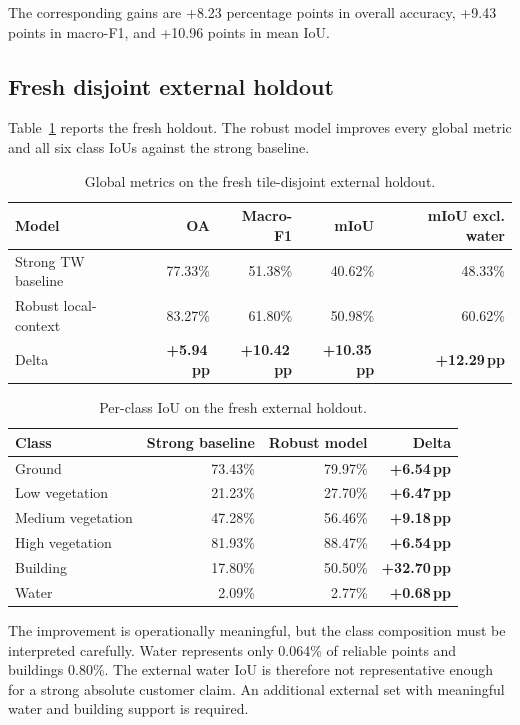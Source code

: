 \documentclass[11pt,a4paper]{article}
\newcommand{\pp}{\,pp}
\newcommand{\good}[1]{\textcolor{evogreen}{\textbf{#1}}}
\begin{document}
The corresponding gains are +8.23 percentage points in overall accuracy, +9.43 points in macro-F1, and +10.96 points in mean IoU.

\subsection{Fresh disjoint external holdout}

Table~\ref{tab:fresh-global} reports the fresh holdout. The robust model improves every global metric and all six class IoUs against the strong baseline.

\begin{table}[ht]
\centering
\caption{Global metrics on the fresh tile-disjoint external holdout.}
\label{tab:fresh-global}
\begin{tabular}{lrrrr}
\toprule
Model & OA & Macro-F1 & mIoU & mIoU excl. water \\
\midrule
Strong TW baseline & 77.33\% & 51.38\% & 40.62\% & 48.33\% \\
Robust local-context & 83.27\% & 61.80\% & 50.98\% & 60.62\% \\
\midrule
Delta & \good{+5.94\pp} & \good{+10.42\pp} & \good{+10.35\pp} & \good{+12.29\pp} \\
\bottomrule
\end{tabular}
\end{table}

\begin{table}[ht]
\centering
\caption{Per-class IoU on the fresh external holdout.}
\label{tab:fresh-class}
\begin{tabular}{lrrr}
\toprule
Class & Strong baseline & Robust model & Delta \\
\midrule
Ground & 73.43\% & 79.97\% & \good{+6.54\pp} \\
Low vegetation & 21.23\% & 27.70\% & \good{+6.47\pp} \\
Medium vegetation & 47.28\% & 56.46\% & \good{+9.18\pp} \\
High vegetation & 81.93\% & 88.47\% & \good{+6.54\pp} \\
Building & 17.80\% & 50.50\% & \good{+32.70\pp} \\
Water & 2.09\% & 2.77\% & \good{+0.68\pp} \\
\bottomrule
\end{tabular}
\end{table}

The improvement is operationally meaningful, but the class composition must be interpreted carefully. Water represents only 0.064\% of reliable points and buildings 0.80\%. The external water IoU is therefore not representative enough for a strong absolute customer claim. An additional external set with meaningful water and building support is required.
\end{document}

